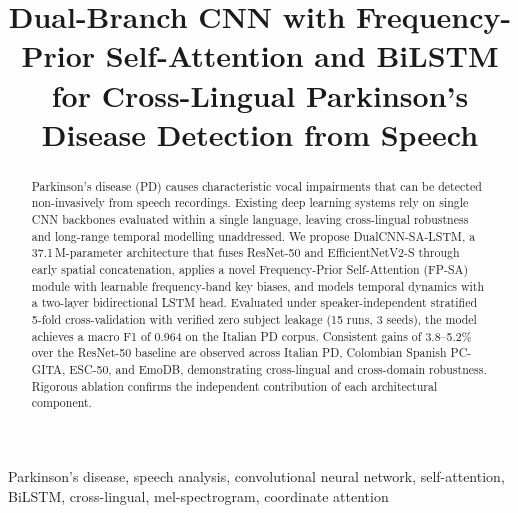 \documentclass[conference]{IEEEtran}
\begin{document}
\title{Dual-Branch CNN with Frequency-Prior Self-Attention and BiLSTM for Cross-Lingual Parkinson's Disease Detection from Speech}

\author{
\and
{}
}

\maketitle

\begin{abstract}
Parkinson's disease (PD) causes characteristic vocal impairments that can be detected non-invasively from speech recordings. Existing deep learning systems rely on single CNN backbones evaluated within a single language, leaving cross-lingual robustness and long-range temporal modelling unaddressed. We propose DualCNN-SA-LSTM, a 37.1\,M-parameter architecture that fuses ResNet-50 and EfficientNetV2-S through early spatial concatenation, applies a novel Frequency-Prior Self-Attention (FP-SA) module with learnable frequency-band key biases, and models temporal dynamics with a two-layer bidirectional LSTM head. Evaluated under speaker-independent stratified 5-fold cross-validation with verified zero subject leakage (15 runs, 3 seeds), the model achieves a macro F1 of 0.964 on the Italian PD corpus. Consistent gains of 3.8--5.2\% over the ResNet-50 baseline are observed across Italian PD, Colombian Spanish PC-GITA, ESC-50, and EmoDB, demonstrating cross-lingual and cross-domain robustness. Rigorous ablation confirms the independent contribution of each architectural component.
\end{abstract}

\begin{IEEEkeywords}
Parkinson's disease, speech analysis, convolutional neural network, self-attention, BiLSTM, cross-lingual, mel-spectrogram, coordinate attention
\end{IEEEkeywords}
\end{document}
